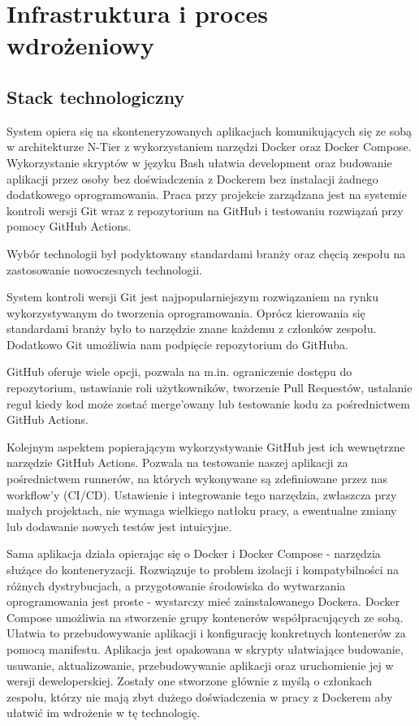 \chapter{Infrastruktura i proces wdrożeniowy}

\section{Stack technologiczny}
\par
System opiera się na skonteneryzowanych aplikacjach komunikujących się ze sobą w architekturze \gls{N-Tier} z wykorzystaniem narzędzi \gls{Docker} oraz \gls{Docker Compose}.
Wykorzystanie \gls{skrypt}ów w języku Bash ułatwia development oraz budowanie aplikacji przez osoby bez doświadczenia z \gls{Docker}em bez instalacji żadnego dodatkowego oprogramowania.
Praca przy projekcie zarządzana jest na systemie kontroli wersji \gls{Git} wraz z \gls{repozytorium} na \gls{GitHub} i testowaniu rozwiązań przy pomocy \gls{GitHub Actions}.
\par
Wybór technologii był podyktowany standardami branży oraz chęcią zespołu na zastosowanie nowoczesnych technologii.
\par
System kontroli wersji \gls{Git} jest najpopularniejszym rozwiązaniem na rynku wykorzystywanym do tworzenia oprogramowania.
Oprócz kierowania się standardami branży było to narzędzie znane każdemu z członków zespołu.
Dodatkowo \gls{Git} umożliwia nam podpięcie \gls{repozytorium} do \gls{GitHub}a.
\par
\gls{GitHub} oferuje wiele opcji, pozwala na m.in. ograniczenie dostępu do \gls{repozytorium}, ustawianie roli użytkowników, tworzenie \gls{Pull Request}ów, ustalanie reguł kiedy kod może zostać \gls{merge}'owany lub testowanie kodu za pośrednictwem \gls{GitHub Actions}.
\par
Kolejnym aspektem popierającym wykorzystywanie \gls{GitHub} jest ich wewnętrzne narzędzie \gls{GitHub Actions}.
Pozwala na testowanie naszej aplikacji za pośrednictwem \gls{runner}ów, na których wykonywane są zdefiniowane przez nas \gls{workflow}'y (\gls{CI/CD}).
Ustawienie i integrowanie tego narzędzia, zwłaszcza przy małych projektach, nie wymaga wielkiego natłoku pracy, a ewentualne zmiany lub dodawanie nowych testów jest intuicyjne.
\par
Sama aplikacja działa opierając się o \gls{Docker} i \gls{Docker Compose} - narzędzia służące do \gls{kontener}yzacji.
Rozwiązuje to problem izolacji i kompatybilności na różnych dystrybucjach, a przygotowanie środowiska do wytwarzania oprogramowania jest proste - wystarczy mieć zainstalowanego \gls{Docker}a.
\gls{Docker Compose} umożliwia na stworzenie grupy \gls{kontener}ów współpracujących ze sobą.
Ułatwia to przebudowywanie aplikacji i konfigurację konkretnych \gls{kontener}ów za pomocą \gls{manifest}u.
Aplikacja jest opakowana w \gls{skrypt}y ułatwiające budowanie, usuwanie, aktualizowanie, przebudowywanie aplikacji oraz uruchomienie jej w wersji deweloperskiej.
Zostały one stworzone głównie z myślą o członkach zespołu, którzy nie mają zbyt dużego doświadczenia w pracy z \gls{Docker}em aby ułatwić im wdrożenie w tę technologię.

